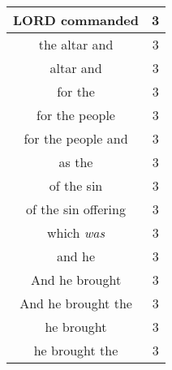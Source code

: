 \begin{center}
\begin{longtable}{|c|c|}
LORD commanded & 3\\ \hline 
the altar and & 3\\ \hline 
altar and & 3\\ \hline 
for the & 3\\ \hline 
for the people & 3\\ \hline 
for the people and & 3\\ \hline 
as the & 3\\ \hline 
of the sin & 3\\ \hline 
of the sin offering & 3\\ \hline 
which \emph{was} & 3\\ \hline 
and he & 3\\ \hline 
And he brought & 3\\ \hline 
And he brought the & 3\\ \hline 
he brought & 3\\ \hline 
he brought the & 3\\ \hline 
\end{longtable}
\end{center}






